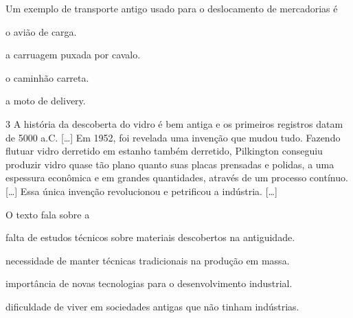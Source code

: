 
Um exemplo de transporte antigo usado para o deslocamento de mercadorias é

\begin{minipage}{0.5\textwidth}
\begin{escolha}
\item o avião de carga.

\item a carruagem puxada por cavalo.

\item o caminhão carreta.

\item a moto de delivery.
\end{escolha}
\end{minipage}


\num{3} A história da descoberta do vidro é bem antiga e os primeiros
registros datam de 5000 a.C. {[}\ldots{}{]} Em 1952, foi revelada uma invenção que
mudou tudo. Fazendo flutuar vidro derretido em estanho também derretido,
Pilkington conseguiu produzir vidro quase tão plano quanto suas placas
prensadas e polidas, a uma espessura econômica e em grandes quantidades,
através de um processo contínuo. {[}\ldots{}{]} Essa única invenção revolucionou e
petrificou a indústria. {[}\ldots{}{]}


O texto fala sobre a

\begin{escolha}
\item falta de estudos técnicos sobre materiais descobertos na antiguidade.

\item necessidade de manter técnicas tradicionais na produção em massa.

\item importância de novas tecnologias para o desenvolvimento industrial.

\item dificuldade de viver em sociedades antigas que não tinham indústrias.
\end{escolha}




